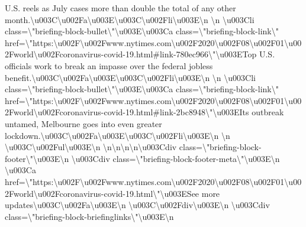 U.S. reels as July cases more than double the total of any other
month.\textbackslash{}u003C\textbackslash{}u002Fa\textbackslash{}u003E\textbackslash{}u003C\textbackslash{}u002Fli\textbackslash{}u003E\textbackslash{}n
\textbackslash{}n \textbackslash{}u003Cli
class=\textbackslash{}"briefing-block-bullet\textbackslash{}"\textbackslash{}u003E\textbackslash{}u003Ca
class=\textbackslash{}"briefing-block-link\textbackslash{}"
href=\textbackslash{}"https:\textbackslash{}u002F\textbackslash{}u002Fwww.nytimes.com\textbackslash{}u002F2020\textbackslash{}u002F08\textbackslash{}u002F01\textbackslash{}u002Fworld\textbackslash{}u002Fcoronavirus-covid-19.html\#link-780ec966\textbackslash{}"\textbackslash{}u003ETop
U.S. officials work to break an impasse over the federal jobless
benefit.\textbackslash{}u003C\textbackslash{}u002Fa\textbackslash{}u003E\textbackslash{}u003C\textbackslash{}u002Fli\textbackslash{}u003E\textbackslash{}n
\textbackslash{}n \textbackslash{}u003Cli
class=\textbackslash{}"briefing-block-bullet\textbackslash{}"\textbackslash{}u003E\textbackslash{}u003Ca
class=\textbackslash{}"briefing-block-link\textbackslash{}"
href=\textbackslash{}"https:\textbackslash{}u002F\textbackslash{}u002Fwww.nytimes.com\textbackslash{}u002F2020\textbackslash{}u002F08\textbackslash{}u002F01\textbackslash{}u002Fworld\textbackslash{}u002Fcoronavirus-covid-19.html\#link-2bc8948\textbackslash{}"\textbackslash{}u003EIts
outbreak untamed, Melbourne goes into even greater
lockdown.\textbackslash{}u003C\textbackslash{}u002Fa\textbackslash{}u003E\textbackslash{}u003C\textbackslash{}u002Fli\textbackslash{}u003E\textbackslash{}n
\textbackslash{}n
\textbackslash{}u003C\textbackslash{}u002Ful\textbackslash{}u003E\textbackslash{}n
\textbackslash{}n\textbackslash{}n\textbackslash{}n\textbackslash{}n\textbackslash{}u003Cdiv
class=\textbackslash{}"briefing-block-footer\textbackslash{}"\textbackslash{}u003E\textbackslash{}n
\textbackslash{}u003Cdiv
class=\textbackslash{}"briefing-block-footer-meta\textbackslash{}"\textbackslash{}u003E\textbackslash{}n
\textbackslash{}u003Ca
href=\textbackslash{}"https:\textbackslash{}u002F\textbackslash{}u002Fwww.nytimes.com\textbackslash{}u002F2020\textbackslash{}u002F08\textbackslash{}u002F01\textbackslash{}u002Fworld\textbackslash{}u002Fcoronavirus-covid-19.html\textbackslash{}"\textbackslash{}u003ESee
more
updates\textbackslash{}u003C\textbackslash{}u002Fa\textbackslash{}u003E\textbackslash{}n
\textbackslash{}u003C\textbackslash{}u002Fdiv\textbackslash{}u003E\textbackslash{}n
\textbackslash{}u003Cdiv
class=\textbackslash{}"briefing-block-briefinglinks\textbackslash{}"\textbackslash{}u003E\textbackslash{}n
